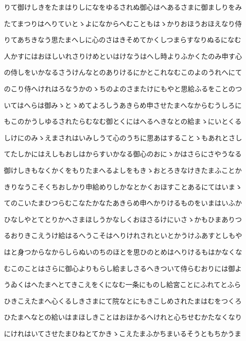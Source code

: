 \documentclass[a4paper,11pt,landscape]{ltjtarticle}
\begin{document}
\par\medskip
りて御けしきをたまはりしになをゆるされぬ御心はへあるさまに御ましりをみ
\par\medskip
たてまつりはへりていとゝよになからへむこともはゝかりおほうおほえなり侍
\par\medskip
りてあちきなう思たまへしに心のさはきそめてかくしつまらすなりぬるになむ
\par\medskip
人かすにはおほしいれさりけめといはけなうはへし時よりふかくたのみ申す心
\par\medskip
の侍しをいかなるさうけんなとのありけるにかとこれなむこのよのうれへにて
\par\medskip
のこり侍へけれはろなうかのゝちのよのさまたけにもやと思給ふるをことのつ
\par\medskip
いてはへらは御みゝとゝめてよろしうあきらめ申させたまへなからむうしろに
\par\medskip
もこのかうしゆるされたらむなむ御とくにはへるへきなとの給まゝにいとくる
\par\medskip
しけにのみゝえまされはいみしうて心のうちに思あはすることゝもあれとさし
\par\medskip
てたしかにはえしもおしはからすいかなる御心のおにゝかはさらにさやうなる
\par\medskip
御けしきもなくかくをもりたまへるよしをもきゝおとろきなけきたまふことか
\par\medskip
きりなうこそくちおしかり申給めりしかなとかくおほすことあるにてはいまゝ
\par\medskip
てのこいたまひつらむこなたかなたあきらめ申へかりけるものをいまはいふか
\par\medskip
ひなしやとてとりかへさまほしうかなしくおほさるけにいさゝかもひまありつ
\par\medskip
るおりきこえうけ給はるへうこそはへりけれされといとかうけふあすとしもや
\par\medskip
はと身つからなからしらぬいのちのほとを思ひのとめはへりけるもはかなくな
\par\medskip
むこのことはさらに御心よりもらし給ましさるへきついて侍らむおりには御よ
\par\medskip
うゐくはへたまへとてきこえをくになむ一条にものし給宮ことにふれてとふら
\par\medskip
ひきこえたまへ心くるしきさまにて院なとにもきこしめされたまはむをつくろ
\par\medskip
ひたまへなとの給いはまほしきことはおほかるへけれと心ちせむかたなくなり
\par\medskip
にけれはいてさせたまひねとてかきゝこえたまふかちまいるそうともちかうま
\end{document}
